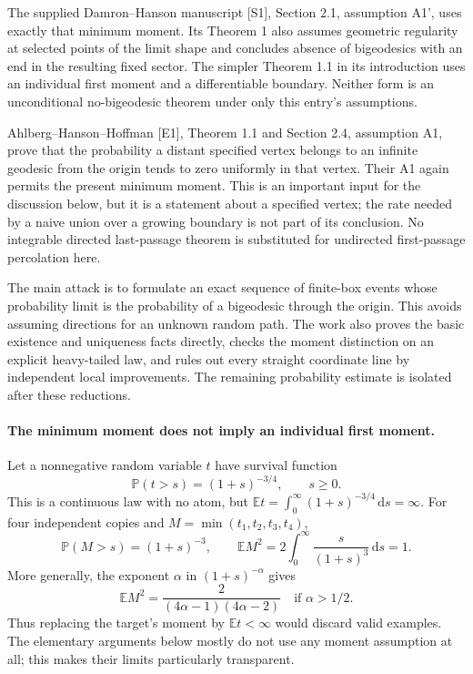 \documentclass[11pt]{article}
\begin{document}
The supplied Damron--Hanson manuscript [S1], Section 2.1, assumption A1',
uses exactly that minimum moment. Its Theorem 1 also assumes geometric
regularity at selected points of the limit shape and concludes absence of
bigeodesics with an end in the resulting fixed sector. The simpler
Theorem 1.1 in its introduction uses an individual first moment and a
differentiable boundary. Neither form is an unconditional no-bigeodesic
theorem under only this entry's assumptions.

Ahlberg--Hanson--Hoffman [E1], Theorem 1.1 and Section 2.4, assumption A1,
prove that the probability a distant specified vertex belongs to an
infinite geodesic from the origin tends to zero uniformly in that vertex.
Their A1 again permits the present minimum moment. This is an important
input for the discussion below, but it is a statement about a specified
vertex; the rate needed by a naive union over a growing boundary is not
part of its conclusion. No integrable directed last-passage theorem is
substituted for undirected first-passage percolation here.

The main attack is to formulate an exact sequence of finite-box events
whose probability limit is the probability of a bigeodesic through the
origin. This avoids assuming directions for an unknown random path.
The work also proves the basic existence and uniqueness facts directly,
checks the moment distinction on an explicit heavy-tailed law, and rules
out every straight coordinate line by independent local improvements.
The remaining probability estimate is isolated after these reductions.

\paragraph{The minimum moment does not imply an individual first moment.}
Let a nonnegative random variable $t$ have survival function
\[
 \mathbb P(t>s)=(1+s)^{-3/4},\qquad s\geq0.
\]
This is a continuous law with no atom, but
$\mathbb E t=\int_0^\infty(1+s)^{-3/4}\,\mathrm ds=\infty$.
For four independent copies and $M=\min(t_1,t_2,t_3,t_4)$,
\[
 \mathbb P(M>s)=(1+s)^{-3},\qquad
 \mathbb E M^2=2\int_0^\infty\frac{s}{(1+s)^3}\,\mathrm ds=1.
\]
More generally, the exponent $\alpha$ in $(1+s)^{-\alpha}$ gives
\[
 \mathbb E M^2=\frac{2}{(4\alpha-1)(4\alpha-2)}
                        \quad\text{if }\alpha>1/2.
\]
Thus replacing the target's moment by $\mathbb E t<\infty$ would discard
valid examples. The elementary arguments below mostly do not use any
moment assumption at all; this makes their limits particularly transparent.
\end{document}
